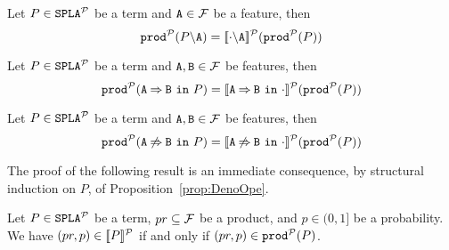 Let $P\in\fodaPAp$ be a term and $\feature{A}\in\calF$ be a feature, then
  $$\prodp(\forbid{A}{P})=\semdenp{\forbid{A}{\cdot}}(\prodp(P))$$
%

Let $P\in\fodaPAp$ be a term and $\feature{A},\feature{B}\in\calF$
  be features, then
$$\prodp(\require{A}{B}{P})=\semdenp{\require{A}{B}{\cdot}}(\prodp(P))$$
%

Let $P\in\fodaPAp$ be a term and $\feature{A},\feature{B}\in\calF$
  be features, then
$$    \prodp(\exclude{A}{B}{P})=\semdenp{\exclude{A}{B}{\cdot}}(\prodp(P))$$
\eprop

The proof of the following result is an immediate consequence, by structural induction on $P$, of
Proposition~\ref{prop:DenoOpe}.


\bthm\label{prop:equivprob}
  Let $P\in\fodaPAp$ be a term, $pr\subseteq\calF$ be a product, and
  $p\in(0,1]$ be a probability. We have $ (pr,p)\in\semdenp{P}$ if and only if
  $(pr,p)\in\prodp(P)$.
\ethm



